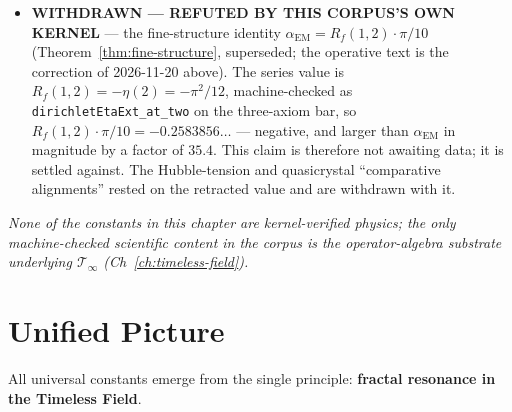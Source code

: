 \begin{itemize}
\item \textbf{WITHDRAWN --- REFUTED BY THIS CORPUS'S OWN KERNEL} --- the fine-structure identity $\alpha_{\text{EM}}=R_f(1,2)\cdot\pi/10$ (Theorem~\ref{thm:fine-structure}, superseded; the operative text is the correction of 2026-11-20 above). The series value is $R_f(1,2)=-\eta(2)=-\pi^{2}/12$, machine-checked as \texttt{dirichletEtaExt\_at\_two} on the three-axiom bar, so $R_f(1,2)\cdot\pi/10=-0.2583856\ldots$ --- negative, and larger than $\alpha_{\text{EM}}$ in magnitude by a factor of $35.4$. This claim is therefore not awaiting data; it is settled against. The Hubble-tension and quasicrystal ``comparative alignments'' rested on the retracted value and are withdrawn with it.
\end{itemize}
\emph{None of the constants in this chapter are kernel-verified physics; the only machine-checked scientific content in the corpus is the operator-algebra substrate underlying $\mathcal{T}_\infty$ (Ch~\ref{ch:timeless-field}).}

\section{Unified Picture}

All universal constants emerge from the single principle: \textbf{fractal resonance in the Timeless Field}.

